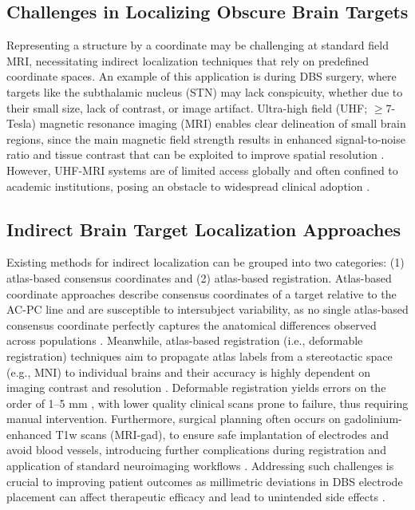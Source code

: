 \subsection{Challenges in Localizing Obscure Brain Targets}
Representing a structure by a coordinate may be challenging at standard field MRI, necessitating indirect localization techniques that rely on predefined coordinate spaces. An example of this application is during DBS surgery, where targets like the subthalamic nucleus (STN) may lack conspicuity, whether due to their small size, lack of contrast, or image artifact. Ultra-high field (UHF; $\geq$7-Tesla) magnetic resonance imaging (MRI) enables clear delineation of small brain regions, since the main magnetic field strength results in enhanced signal-to-noise ratio and tissue contrast that can be exploited to improve spatial resolution \cite{ref}. However, UHF-MRI systems are of limited access globally and often confined to academic institutions, posing an obstacle to widespread clinical adoption \cite{clarke2020}.
\subsection{Indirect Brain Target Localization Approaches}
Existing methods for indirect localization can be grouped into two categories: (1) atlas-based consensus coordinates and (2) atlas-based registration. Atlas-based coordinate approaches describe consensus coordinates of a target relative to the AC-PC line and are susceptible to intersubject variability, as no single atlas-based consensus coordinate perfectly captures the anatomical differences observed across populations \cite{ref}. Meanwhile, atlas-based registration (i.e., deformable registration) techniques aim to propagate atlas labels from a stereotactic space (e.g., MNI) to individual brains and their accuracy is highly dependent on imaging contrast and resolution \cite{klein2009, fonov2011}. Deformable registration yields errors on the order of 1--5 mm \cite{ref}, with lower quality clinical scans prone to failure, thus requiring manual intervention. Furthermore, surgical planning often occurs on gadolinium-enhanced T1w scans (MRI-gad), to ensure safe implantation of electrodes and avoid blood vessels, introducing further complications during registration \cite{ref17} and application of standard neuroimaging workflows \cite{ref18, ref19}. Addressing such challenges is crucial to improving patient outcomes as millimetric deviations in DBS electrode placement can affect therapeutic efficacy and lead to unintended side effects \cite{ref}.
